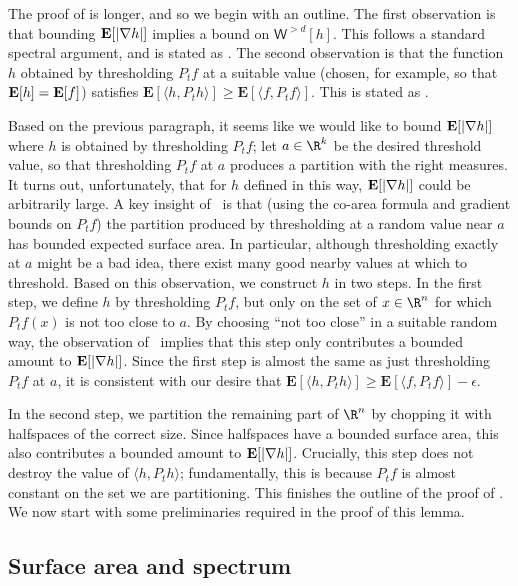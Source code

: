 \documentclass{toc}
\newcommand{\E}{{\bf E}}
\begin{document}
The proof of  is longer, and so we begin with an outline.
The first observation is that
bounding $\E[|\nabla h|]$ implies a bound on $\mathsf{W}^{> d}[h]$.
This follows a standard spectral argument, and is stated as .
The second observation is that the function $h$ obtained by thresholding
$P_t f$ at a suitable value (chosen, for example, so that $\E[h] = \E[f]$)
satisfies $\mathbf{E}[\langle h, P_t h\rangle] \ge \mathbf{E}[ \langle f, P_t f\rangle]$. This is stated as .

Based on the previous paragraph, it seems like we would like to bound $\E[|\nabla h|]$ where $h$ is obtained
by thresholding $P_t f$; let $a \in \R^k$ be the desired threshold value, so that thresholding $P_t f$ at $a$
produces a partition with the right measures. It turns out, unfortunately, that for $h$ defined in this way,
$\E[|\nabla h|]$ could be
arbitrarily large. A key insight of~\cite{KNOW14} is that (using the co-area formula and gradient bounds on $P_t f$)
the partition produced by thresholding at a random value near $a$ has bounded expected surface area. In particular,
although thresholding exactly at $a$ might be a bad idea,
there exist many good nearby values at which to threshold.
Based on this observation, we construct $h$ in two steps. In the first step, we define $h$ by thresholding $P_t f$,
but only on the set of $x \in \R^n$
for which $P_t f(x)$ is not too close to $a$. By choosing ``not too close'' in a suitable random way, the observation
of~\cite{KNOW14} implies that this step only contributes a bounded amount to $\E[|\nabla h|]$. Since the first step
is almost the same as just thresholding $P_t f$ at $a$, it is consistent with our desire that
$\mathbf{E}[\langle h, P_t h\rangle ]\ge \mathbf{E}[\langle f, P_t f\rangle] - \epsilon$.

In the second step, we partition the remaining part of $\R^n$ by chopping it with halfspaces of the correct size.
Since halfspaces have a bounded surface area, this also contributes a bounded amount to $\E[|\nabla h|]$.
Crucially, this step does not
destroy the value of $\langle h, P_t h\rangle$; fundamentally, this is because $P_t f$ is almost constant on the set
we are partitioning. This finishes the outline of the proof of . We now start with some preliminaries required in the proof of this lemma. 

\subsection{Surface area and spectrum}
\end{document}
